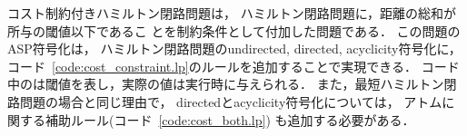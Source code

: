 



コスト制約付きハミルトン閉路問題は，
ハミルトン閉路問題に，距離の総和が所与の閾値以下であるこ
とを制約条件として付加した問題である．
この問題のASP符号化は，
ハミルトン閉路問題の\textsf{undirected}, \textsf{directed},
\textsf{acyclicity}符号化に，
コード~\ref{code:cost_constraint.lp}のルールを追加することで実現できる．
%
コード中のは閾値を表し，実際の値は実行時に与えられる．
また，最短ハミルトン閉路問題の場合と同じ理由で，
\textsf{directed}と\textsf{acyclicity}符号化については，
アトムに関する補助ルール(コード~\ref{code:cost_both.lp})
も追加する必要がある．

